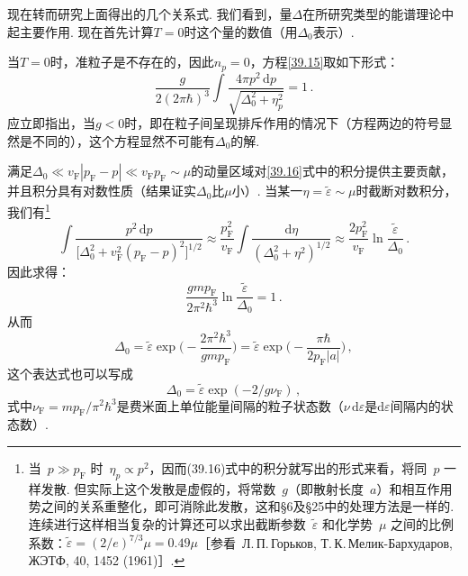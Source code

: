 现在转而研究上面得出的几个关系式. 我们看到，量$\Delta$在所研究类型的能谱理论中起主要作用. 现在首先计算$T=0$时这个量的数值（用$\Delta_0$表示）.

当$T=0$时，准粒子是不存在的，因此$n_p=0$，方程\eqref{39.15}取如下形式：
\begin{equation}
\frac{g}{2(2\pi\hbar)^3}\int\frac{4\pi p^2\,\mathrm dp}{\sqrt{\Delta_0^2 + \eta_p^2}} = 1\,.
\label{39.16}
\end{equation}
应立即指出，当$g<0$时，即在粒子间呈现排斥作用的情况下（方程两边的符号显然是不同的），这个方程显然不可能有$\Delta_0$的解.

满足$\Delta_0\ll v_{\mathrm F}|p_{\mathrm F}-p|\ll v_{\mathrm F}p_{\mathrm F}\sim\mu$的动量区域对\eqref{39.16}式中的积分提供主要贡献，并且积分具有对数性质（结果证实$\Delta_0$比$\mu$小）. 当某一$\eta=\tilde\varepsilon\sim\mu$时截断对数积分，我们有\footnote{当~$p\gg p_{\mathrm F}$ 时~$\eta_p\propto p^2$，因而(39.16)式中的积分就写出的形式来看，将同~$p$ 一样发散. 但实际上这个发散是虚假的，将常数~$g$（即散射长度~$a$）和相互作用势之间的关系重整化，即可消除此发散，这和§6及§25中的处理方法是一样的. 连续进行这样相当复杂的计算还可以求出截断参数~$\tilde\varepsilon$ 和化学势~$\mu$ 之间的比例系数：$\tilde\varepsilon=(2/e)^{7/3}\mu=0.49\mu$［参看~Л.\,П.\,Горьков, Т.\,К.\,Мелик-Бархударов, ЖЭТФ, 40, 1452 (1961)］.}
\begin{equation*}
\int\frac{p^2\,\mathrm dp}{\bigl[\Delta_0^2 + v_{\mathrm F}^2(p_{\mathrm F}-p)^2\bigr]^{1/2}}
\approx \frac{p_{\mathrm F}^2}{v_{\mathrm F}}\int\frac{\mathrm d\eta}{(\Delta_0^2 + \eta^2)^{1/2}}
\approx \frac{2p_{\mathrm F}^2}{v_{\mathrm F}}\ln\frac{\tilde\varepsilon}{\Delta_0}\,.
\end{equation*}
因此求得：
\begin{equation}
\frac{gmp_{\mathrm F}}{2\pi^2\hbar^3}\ln\frac{\tilde\varepsilon}{\Delta_0} = 1\,.
\label{39.17}
\end{equation}
从而
\begin{equation}
\Delta_0 = \tilde\varepsilon\exp\Biggl(-\frac{2\pi^2\hbar^3}{gmp_{\mathrm F}}\Biggr)
= \tilde\varepsilon\exp\Biggl(-\frac{\pi\hbar}{2p_{\mathrm F}|a|}\Biggr)\,,
\label{39.18}
\end{equation}
这个表达式也可以写成
\begin{equation}
\Delta_0 = \tilde\varepsilon\exp(-2/g\nu_{\mathrm F})\,,
\label{39.19}
\end{equation}
式中$\nu_{\mathrm F}=mp_{\mathrm F}/\pi^2\hbar^3$是费米面上单位能量间隔的粒子状态数（$\nu\,\mathrm d\varepsilon$是$\mathrm d\varepsilon$间隔内的状态数）.

